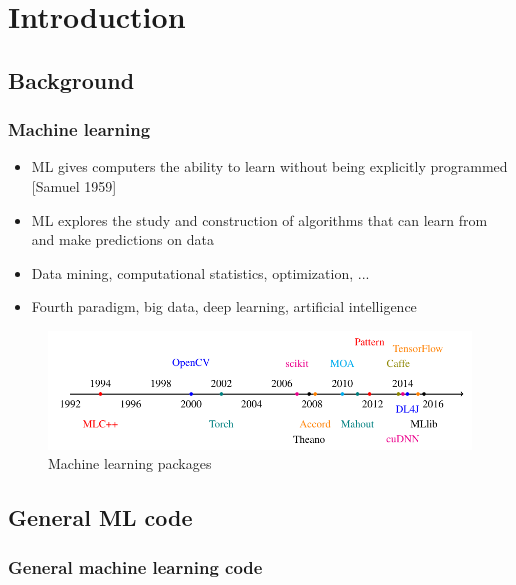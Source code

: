 
\section{Introduction}\label{sec:intro}

\subsection{Background}

\begin{frame}
  \MyLogo
  \frametitle{Machine learning}  

\begin{itemize}

\item ML gives computers the ability to learn without being explicitly programmed [Samuel 1959]

\item ML explores the study and construction of algorithms that can learn from and make predictions on data

\item Data mining, computational statistics, optimization, ...

\item Fourth paradigm, big data, deep learning, artificial intelligence 

\end{itemize}

\begin{figure}[htbp] %
   \centering
   \includegraphics[width=\linewidth]{figures/ML.pdf} 
   \caption{Machine learning packages}
   \label{fig:MLcode}
\end{figure}

\end{frame}

\subsection{General ML code}

\begin{frame}
  \MyLogo
  \frametitle{General machine learning code}  

\end{frame}

